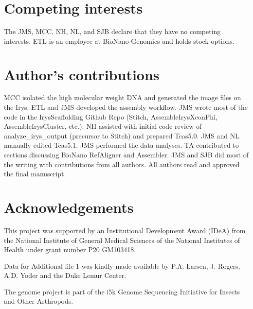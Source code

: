 \documentclass{bmcart}
\begin{document}
\begin{backmatter}

\section*{Competing interests}
  The JMS, MCC, NH, NL, and SJB declare that they have no competing interests. ETL is an employee at BioNano Genomics and holds stock options.


\section*{Author's contributions}
MCC isolated the high molecular weight DNA and generated the image files on the Irys. ETL and JMS developed the assembly workflow. JMS wrote most of the code in the IrysScaffolding Github Repo (Stitch, AssembleIrysXeonPhi, AssembleIrysCluster, etc.). NH assisted with initial code review of analyze\_irys\_output (precursor to Stitch) and prepared Tcas5.0. JMS and NL manually edited Tcas5.1. JMS performed the data analyses. TA contributed to sections discussing BioNano RefAligner and Assembler. JMS and SJB did most of the writing with contributions from all authors. All authors read and approved the final manuscript.

\section*{Acknowledgements}
  This project was supported by an Institutional Development Award (IDeA) from the National Institute of General Medical Sciences of the National Institutes of Health under grant number P20 GM103418. 

Data for Additional file 1 was kindly made available by P.A. Larsen, J. Rogers, A.D. Yoder and the Duke Lemur Center.

The \cite{Tribolium castaneum} genome project is part of the i5k Genome Sequencing Initiative for Insects and Other Arthropods.



\end{backmatter}
\end{document}
